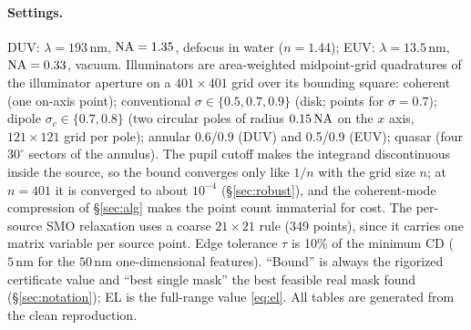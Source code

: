 \documentclass[11pt,a4paper]{article}
\newcommand{\SI}[2]{\ensuremath{#1\,\mathrm{#2}}}\newcommand{\SIrange}[3]{\ensuremath{#1\text{--}#2\,\mathrm{#3}}}
\theoremstyle{remark}\newtheorem*{remark}{Remark}
\begin{document}
\paragraph{Settings.} DUV: $\lambda=\SI{193}{nm}$, $\mathrm{NA}=1.35$, defocus in water ($n=1.44$); EUV: $\lambda=\SI{13.5}{nm}$, $\mathrm{NA}=0.33$, vacuum. Illuminators are area-weighted midpoint-grid quadratures of the illuminator aperture on a $401\times401$ grid over its bounding square: coherent (one on-axis point); conventional $\sigma\in\{0.5,0.7,0.9\}$ (disk; \quadNconv{} points for $\sigma=0.7$); dipole $\sigma_c\in\{0.7,0.8\}$ (two circular poles of radius $0.15\,\mathrm{NA}$ on the $x$ axis, $121\times121$ grid per pole); annular 0.6/0.9 (DUV) and 0.5/0.9 (EUV); quasar (four $30^\circ$ sectors of the annulus). The pupil cutoff makes the integrand discontinuous inside the source, so the bound converges only like $1/n$ with the grid size $n$; at $n=401$ it is converged to about $10^{-4}$ (\S\ref{sec:robust}), and the coherent-mode compression of \S\ref{sec:alg} makes the point count immaterial for cost. The per-source SMO relaxation uses a coarse $21\times21$ rule (349 points), since it carries one matrix variable per source point. Edge tolerance $\tau$ is 10\% of the minimum CD (\SI{5}{nm} for the \SI{50}{nm} one-dimensional features). ``Bound'' is always the rigorized certificate value and ``best single mask'' the best feasible real mask found (\S\ref{sec:notation}); EL is the full-range value \eqref{eq:el}. All tables are generated from the clean reproduction.
\end{document}
